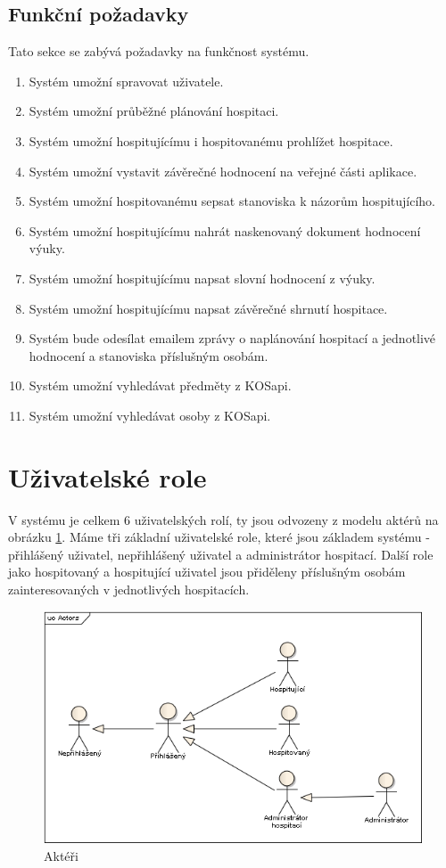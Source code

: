 \subsection{Funkční požadavky}
Tato sekce se zabývá požadavky na funkčnost systému.
\begin{enumerate}
\item Systém umožní spravovat uživatele.
\item Systém umožní průběžné plánování hospitaci.
\item Systém umožní hospitujícímu i hospitovanému prohlížet hospitace.
\item Systém umožní vystavit závěrečné hodnocení na veřejné části aplikace. 
\item Systém umožní hospitovanému sepsat stanoviska k názorům hospitujícího.
\item Systém umožní hospitujícímu nahrát naskenovaný dokument hodnocení výuky.
\item Systém umožní hospitujícímu napsat slovní hodnocení z výuky.
\item Systém umožní hospitujícímu napsat závěrečné shrnutí hospitace.
\item Systém bude odesílat emailem zprávy o naplánování hospitací a jednotlivé hodnocení a stanoviska příslušným osobám.
\item Systém umožní vyhledávat předměty z KOSapi.
\item Systém umožní vyhledávat osoby z KOSapi.
\end{enumerate}

\section{Uživatelské role}
V systému je celkem 6 uživatelských rolí, ty jsou odvozeny z modelu aktérů na obrázku \ref{fig:actors}. Máme tři základní uživatelské role, které jsou základem systému - přihlášený uživatel, nepřihlášený uživatel a administrátor hospitací. Další role jako hospitovaný a hospitující uživatel jsou přiděleny příslušným osobám zainteresovaných v jednotlivých hospitacích.

\begin{figure}[h]
\begin{center}
\includegraphics[width=16cm]{figures/Actors}
\caption{Aktéři}
\label{fig:actors}
\end{center}
\end{figure}

